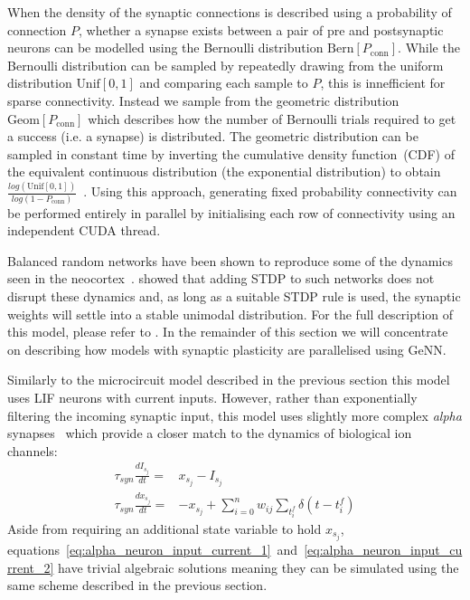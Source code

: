 \documentclass[utf8]{frontiersSCNS} %
\begin{document}
When the density of the synaptic connections is described using a probability of connection $P$, whether a synapse exists between a pair of pre and postsynaptic neurons can be modelled using the Bernoulli distribution $\text{Bern}[P_{\text{conn}}]$.
While the Bernoulli distribution can be sampled by repeatedly drawing from the uniform distribution $\text{Unif}[0, 1]$ and comparing each sample to $P$, this is innefficient for sparse connectivity.
Instead we sample from the geometric distribution $\text{Geom}[P_{\text{conn}}]$ which describes how the number of Bernoulli trials required to get a success (i.e. a synapse) is distributed.
The geometric distribution can be sampled in constant time by inverting the cumulative density function~(CDF) of the equivalent continuous distribution (the exponential distribution) to obtain $\frac{log(\text{Unif}[0, 1])}{log(1 - P_{\text{conn}})}$~\citep{DevroyeLuc2013}.
Using this approach, generating fixed probability connectivity can be performed entirely in parallel by initialising each row of connectivity using an independent CUDA thread.

Balanced random networks have been shown to reproduce some of the dynamics seen in the neocortex~\citep{Brunel1999,Brunel2000}.
\citeauthor{Morrison2007} showed that adding STDP to such networks does not disrupt these dynamics and, as long as a suitable STDP rule is used, the synaptic weights will settle into a stable unimodal distribution.
For the full description of this model, please refer to \citeauthor{Morrison2007}.
In the remainder of this section we will concentrate on describing how models with synaptic plasticity are parallelised using GeNN.

Similarly to the microcircuit model described in the previous section this model uses LIF neurons with current inputs.
However, rather than exponentially filtering the incoming synaptic input, this model uses slightly more complex \textit{alpha} synapses~\citep{Rall1967} which provide a closer match to the dynamics of biological ion channels:
%
\begin{align}
    \tau_{syn} \frac{dI_{s_{j}}}{dt} = & x_{s_{j}} - I_{s_{j}} \label{eq:alpha_neuron_input_current_1}\\ 
    \tau_{syn} \frac{dx_{s_{j}}}{dt} = & -x_{s_{j}} + \sum_{i=0}^{n} w_{ij} \sum_{t_{i}^{f}}  \delta(t - t_{i}^{f}) \label{eq:alpha_neuron_input_current_2}
\end{align}
%
Aside from requiring an additional state variable to hold $x_{s_{j}}$, equations~\ref{eq:alpha_neuron_input_current_1}~and~\ref{eq:alpha_neuron_input_current_2} have trivial algebraic solutions meaning they can be simulated using the same scheme described in the previous section.
\end{document}
